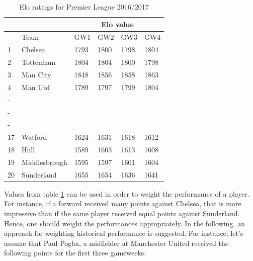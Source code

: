 \begin{table}[H]
\centering
\caption{Elo ratings for Premier League 2016/2017}
\label{Elo.1617}
\begin{tabular}{|l|l|l|l|l|l|}
\cline{2-6}
\multicolumn{1}{l|}{} & \multicolumn{1}{l|}{} & \multicolumn{4}{c|}{Elo value}  \\ \cline{2-6} 
\hline
                      & Team                  & GW1    & GW2    & GW3  & GW4    \\
                      \hline
1                     & Chelsea               & 1793   & 1800   & 1798 & 1804   \\
2                     & Tottenham             & 1804   & 1804   & 1800 & 1798   \\
3                     & Man City              & 1848   & 1856   & 1858 & 1863   \\
4                     & Man Utd               & 1789   & 1797   & 1799 & 1804   \\
-                     &                       &        &        &      &        \\
-                     &                       &        &        &      &        \\
-                     &                       &        &        &      &        \\
17                    & Watford               & 1624   & 1631   & 1618 & 1612   \\
18                    & Hull                  & 1589   & 1603   & 1613 & 1608   \\
19                    & Middlesbrough         & 1595   & 1597   & 1601 & 1604   \\
20                    & Sunderland            & 1655   & 1654   & 1636 & 1641   \\
\hline
\end{tabular}
\end{table}

Values from table \ref{Elo.1617} can be used in order to weight the performance of a player. For instance, if a forward received many points against Chelsea, that is more impressive than if the same player received equal points against Sunderland. Hence, one should weight the performances appropriately. In the following, an approach for weighting historical performance is suggested. For instance, let's assume that Paul Pogba, a midfielder at Manchester United received the following points for the first three gameweeks: 


